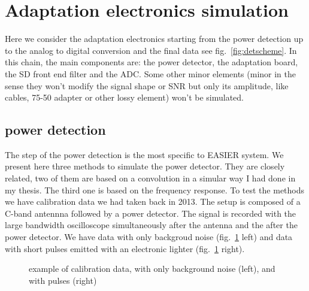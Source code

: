\section{Adaptation electronics simulation}
\label{sec:elec}
Here we  consider the adaptation  electronics starting from  the power
detection up  to the analog to  digital conversion and  the final data
see fig.~\ref{fig:detscheme}.  In this chain, the main components are:
the power detector, the adaptation  board, the SD front end filter and
the ADC.   Some other  minor elements (minor  in the sense  they won't
modify the  signal shape or SNR  but only its  amplitude, like cables,
75-50 adapter or other lossy element) won't be simulated.
\subsection{power detection}
The step of the power detection is the most specific to EASIER system.
We present  here three methods  to simulate the power  detector.  They
are  closely related,  two of  them are  based on  a convolution  in a
simular way  I had done in  my thesis. The  third one is based  on the
frequency response.  To  test the methods we have  calibration data we
had taken  back in 2013.  The setup is  composed of a  C-band antennna
followed by a  power detector.  The signal is  recorded with the large
bandwidth oscilloscope simultaneously after  the antenna and the after
the  power   detector.   We  have  data  with   only  backgroud  noise
(fig.~\ref{fig:signalexample} left) and data with short pulses emitted
with an electronic lighter (fig.~\ref{fig:signalexample} right).
\begin{figure}[!ht]
  \centering
  \hspace*{-3ex}
  \caption{example of calibration data, with only background noise (left), and with pulses (right)}
  \label{fig:signalexample}
\end{figure}

